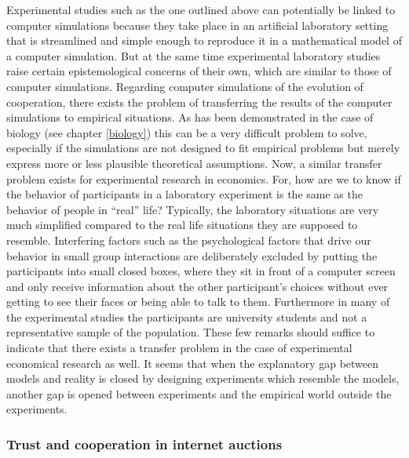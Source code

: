 Experimental studies such as the one outlined above can potentially be linked
to computer simulations because they take place in an artificial laboratory
setting that is streamlined and simple enough to reproduce it in a
mathematical model of a computer simulation. But at the same time experimental
laboratory studies raise certain epistemological concerns of their own, which
are similar to those of computer simulations. Regarding computer simulations
of the evolution of cooperation, there exists the problem of transferring the
results of the computer simulations to empirical situations. As has been
demonstrated in the case of biology (see chapter \ref{biology}) this can be a
very difficult problem to solve, especially if the simulations are not
designed to fit empirical problems but merely express more or less plausible
theoretical assumptions. Now, a similar transfer problem exists for
experimental research in economics. For, how are we to know if the behavior
of participants in a laboratory experiment is the same as the behavior of
people in ``real'' life? Typically, the laboratory situations are very much
simplified compared to the real life situations they are supposed to resemble.
Interfering factors such as the psychological factors that drive our behavior
in small group interactions are deliberately excluded by putting the
participants into small closed boxes, where they sit in front of a computer
screen and only receive information about the other participant's choices
without ever getting to see their faces or being able to talk to them.
Furthermore in many of the experimental studies the participants are
university students and not a representative sample of the population. These
few remarks should suffice to indicate that there exists a transfer problem in
the case of experimental economical research as well. It seems that when the
explanatory gap between models and reality is closed by designing experiments
which resemble the models, another gap is opened between experiments and the 
empirical world outside the experiments.

\subsubsection{Trust and cooperation in internet auctions}
\label{economicsTrust}

